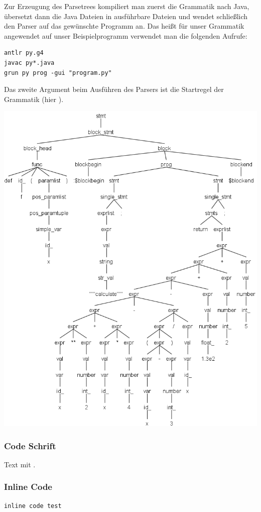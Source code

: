 Zur Erzeugung des Parsetrees kompiliert man zuerst die Grammatik nach Java, übersetzt dann die Java Dateien in ausführbare Dateien und wendet schließlich den Parser auf das gewünschte Programm an. Das heißt für unser Grammatik angewendet auf unser Beispielprogramm verwendet man die folgenden Aufrufe: 
\begin{lstlisting}
antlr py.g4
javac py*.java
grun py prog -gui "program.py"
\end{lstlisting}
Das zweite Argument  beim Ausführen des Parsers ist die Startregel der Grammatik (hier ).
\begin{center}
 \includegraphics[width=0.8\linewidth]{Bilder/program_func_parse_tree2.png}
  \label{g:tree}
\end{center}



\clearpage
\nocite{*}
\printbibliography



\subsubsection*{Code Schrift}
Text mit   .

\subsubsection*{Inline Code}
\begin{lstlisting}[caption=CAP]
inline code test
\end{lstlisting}

